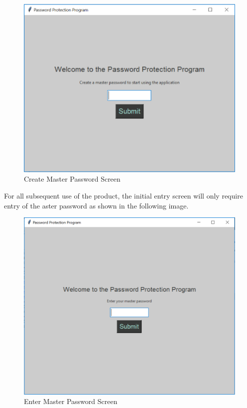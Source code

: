 \documentclass[12pt, titlepage]{article}
\begin{document}
\begin{figure}[h]
	\centering
	\includegraphics[scale=1.0]{images/CreateMasPass.PNG}
	\caption{Create Master Password Screen}
	\label{fig:crMasPass}
\end{figure}

\newpage
For all subsequent use of the product, the initial entry screen will only require entry of the aster password as shown in the following image.

\begin{figure}[h]
	\centering
	\includegraphics[scale=0.9]{images/EnterMasPass.PNG}
	\caption{Enter Master Password Screen}
	\label{fig:enMasPass}
\end{figure}
\end{document}
